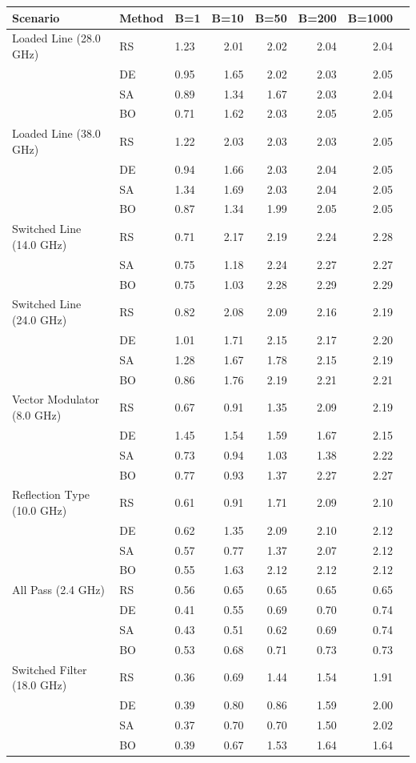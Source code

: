 \begin{tabular}{lllrrrrr}
\toprule
Scenario & Method & B=1 & B=10 & B=50 & B=200 & B=1000 \\
\midrule
Loaded Line (28.0 GHz) & RS & 1.23 & 2.01 & 2.02 & 2.04 & 2.04 \\
 & DE & 0.95 & 1.65 & 2.02 & 2.03 & 2.05 \\
 & SA & 0.89 & 1.34 & 1.67 & 2.03 & 2.04 \\
 & BO & 0.71 & 1.62 & 2.03 & 2.05 & 2.05 \\
Loaded Line (38.0 GHz) & RS & 1.22 & 2.03 & 2.03 & 2.03 & 2.05 \\
 & DE & 0.94 & 1.66 & 2.03 & 2.04 & 2.05 \\
 & SA & 1.34 & 1.69 & 2.03 & 2.04 & 2.05 \\
 & BO & 0.87 & 1.34 & 1.99 & 2.05 & 2.05 \\
Switched Line (14.0 GHz) & RS & 0.71 & 2.17 & 2.19 & 2.24 & 2.28 \\
 & SA & 0.75 & 1.18 & 2.24 & 2.27 & 2.27 \\
 & BO & 0.75 & 1.03 & 2.28 & 2.29 & 2.29 \\
Switched Line (24.0 GHz) & RS & 0.82 & 2.08 & 2.09 & 2.16 & 2.19 \\
 & DE & 1.01 & 1.71 & 2.15 & 2.17 & 2.20 \\
 & SA & 1.28 & 1.67 & 1.78 & 2.15 & 2.19 \\
 & BO & 0.86 & 1.76 & 2.19 & 2.21 & 2.21 \\
Vector Modulator (8.0 GHz) & RS & 0.67 & 0.91 & 1.35 & 2.09 & 2.19 \\
 & DE & 1.45 & 1.54 & 1.59 & 1.67 & 2.15 \\
 & SA & 0.73 & 0.94 & 1.03 & 1.38 & 2.22 \\
 & BO & 0.77 & 0.93 & 1.37 & 2.27 & 2.27 \\
Reflection Type (10.0 GHz) & RS & 0.61 & 0.91 & 1.71 & 2.09 & 2.10 \\
 & DE & 0.62 & 1.35 & 2.09 & 2.10 & 2.12 \\
 & SA & 0.57 & 0.77 & 1.37 & 2.07 & 2.12 \\
 & BO & 0.55 & 1.63 & 2.12 & 2.12 & 2.12 \\
All Pass (2.4 GHz) & RS & 0.56 & 0.65 & 0.65 & 0.65 & 0.65 \\
 & DE & 0.41 & 0.55 & 0.69 & 0.70 & 0.74 \\
 & SA & 0.43 & 0.51 & 0.62 & 0.69 & 0.74 \\
 & BO & 0.53 & 0.68 & 0.71 & 0.73 & 0.73 \\
Switched Filter (18.0 GHz) & RS & 0.36 & 0.69 & 1.44 & 1.54 & 1.91 \\
 & DE & 0.39 & 0.80 & 0.86 & 1.59 & 2.00 \\
 & SA & 0.37 & 0.70 & 0.70 & 1.50 & 2.02 \\
 & BO & 0.39 & 0.67 & 1.53 & 1.64 & 1.64 \\
\bottomrule
\end{tabular}